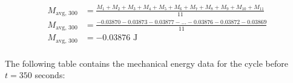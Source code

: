 \documentclass{article}
\begin{document}
            \begin{equation}
                \begin{aligned}
                    M_{\text{avg, 300}} &= \frac{M_1 + M_2 + M_3 + M_4 + M_5 + M_6 + M_7 + M_8 + M_9 + M_{10} + M_{11}}{11} \\
                    M_{\text{avg, 300}} &= \frac{-0.03870 -0.03873 -0.03877 -  \ldots -0.03876 -0.03872 -0.03869}{11} \\
                    M_{\text{avg, 300}} &= -0.03876 \text{ J} \\
                \end{aligned}\label{eq:average-mechanical-energy-cycle-at-300-seconds}
            \end{equation}
            
            The following table contains the mechanical energy data for the cycle before $t=350$ seconds:
            
\end{document}
